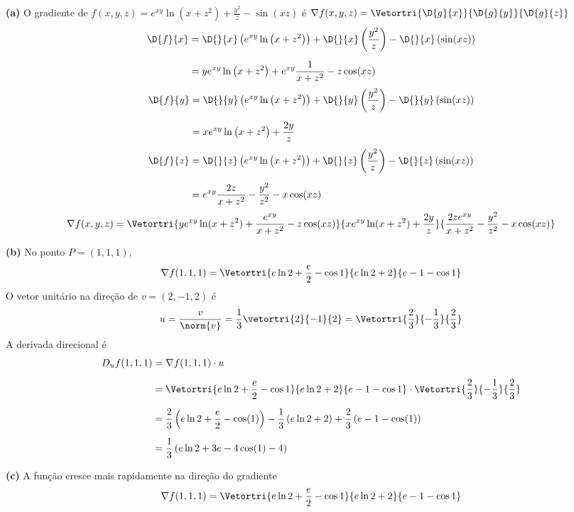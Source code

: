 \documentclass[a4paper,12pt,fleqn]{article}
\begin{document}
\begin{answer}
  \textbf{(a)} O gradiente de
  \(
    f(x,y,z)=e^{xy}\ln\left(x+z^2\right)+\frac{y^2}{z}-\sin(xz)
  \)
  é
  \(
    \nabla f(x, y, z)
    = \Vetortri{\D{g}{x}}{\D{g}{y}}{\D{g}{z}}
  \)
  \begin{align*}
    \D{f}{x}
    & = \D{}{x} \left( e^{xy}\ln\left(x+z^2\right) \right)
      + \D{}{x} \left( \frac{y^2}{z} \right)
      - \D{}{x} \left( \sin(xz) \right)
    \\[2mm]
    & = ye^{xy}\ln\left(x+z^2\right)
      + e^{xy}\frac{1}{x+z^2}
      - z\cos(xz)
  \end{align*}
  \begin{align*}
    \D{f}{y}
    & = \D{}{y} \left( e^{xy}\ln\left(x+z^2\right) \right)
      + \D{}{y} \left( \frac{y^2}{z} \right)
      - \D{}{y} \left( \sin(xz) \right)
    \\[2mm]
    & = xe^{xy}\ln\left(x+z^2\right)
      + \frac{2y}{z}
  \end{align*}
  \begin{align*}
    \D{f}{z}
    & = \D{}{z} \left( e^{xy}\ln\left(x+z^2\right) \right)
      + \D{}{z} \left( \frac{y^2}{z} \right)
      - \D{}{z} \left( \sin(xz) \right)
    \\[2mm]
    & = e^{xy}\frac{2z}{x+z^2}
      - \frac{y^2}{z^2}
      - x\cos(xz)
  \end{align*}
  \[
    \nabla f(x,y,z)
    = \Vetortri{
    ye^{xy}\ln(x+z^2)
    +
    \frac{e^{xy}}{x+z^2}
    -
    z\cos(xz)}{
    xe^{xy}\ln(x+z^2)
    +
    \frac{2y}{z}}{
    \frac{2ze^{xy}}{x+z^2}
    -
    \frac{y^2}{z^2}
    -
    x\cos(xz)}
  \]

  \textbf{(b)} No ponto \(P=(1, 1, 1)\),
  \[
    \nabla f(1, 1, 1)
    = \Vetortri{e\ln2+\frac{e}{2}-\cos1}{e\ln2+2}{e-1-\cos1}
  \]
  O vetor unitário na direção de
  \(
    v = (2, -1, 2)
  \)
  é
  \[
    u
    = \frac{v}{\norm{v}}
    = \frac{1}{3} \vetortri{2}{-1}{2}
    = \Vetortri{\frac{2}{3}}{-\frac{1}{3}}{\frac{2}{3}}
  \]
  A derivada direcional é
  \begin{align*}
    D_{u} f(1, 1, 1)
    & = \nabla f(1, 1, 1) \cdot u                                        \\[2mm]
    & = \Vetortri{e\ln2+\frac{e}{2}-\cos1}{e\ln2+2}{e-1-\cos1} \cdot
        \Vetortri{\frac{2}{3}}{-\frac{1}{3}}{\frac{2}{3}}                \\[2mm]
    & = \frac{2}{3} \left( e\ln 2 + \frac{e}{2} - \cos(1) \right)
      - \frac{1}{3} \left( e\ln 2 + 2 \right)
      + \frac23 \left( e - 1 - \cos(1) \right)                           \\[2mm]
    & = \frac{1}{3} \left( e\ln 2 + 3e - 4\cos(1) - 4 \right)
  \end{align*}

  \textbf{(c)} A função cresce mais rapidamente na direção do gradiente
  \[
    \nabla f(1, 1, 1)
    =\Vetortri{e\ln2+\frac{e}{2}-\cos1}{e\ln2+2}{e-1-\cos1}
  \]
\end{answer}
\end{document}
